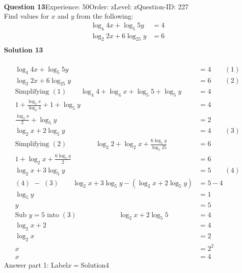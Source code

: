 \documentclass{article}
\begin{document}
\\[4pt]
\noindent\textbf{Question 13}\hspace{20pt}Experience: 50\hspace{20pt}Order: z\hspace{20pt}Level: z\hspace{20pt}Question-ID: 227\\[2pt]
Find values for $x$ and $y$ from the following:
\begin{align*}
\log_{4}4x+\log_{5}5y&=4\\[2pt]
\log_{2}2x+6\log_{25}y&=6\\[-22pt]
\end{align*}
\noindent\textbf{Solution 13}\\[2pt]
\\[-35pt]\begin{align*}
\log_{4}4x+\log_{5}5y&=4\qquad (1)\\[2pt]
\log_{2}2x+6\log_{25}y&=6\qquad (2)\\[2pt]
\text{Simplifying}\,\,(1)\qquad \log_{4}4+\log_{4}x+\log_{5}5+\log_{5}y&=4\\[2pt]
1+\displaystyle\frac{\log_{2}x}{\log_{2}4}+1+\log_{5}y&=4\\[2pt]
\displaystyle\frac{\log_{2}x}{2}+\log_{5}y&=2\\[2pt]
\log_{2}x+2\log_{5}y&=4\qquad (3)\\[2pt]
\text{Simplifying}\,\,(2)\hspace{50pt}\log_{2}2+\log_{2}x+\displaystyle\frac{6\log_{5}y}{\log_{5}25}&=6\\[2pt]
1+\log_{2}x+\displaystyle\frac{6\log_{5}y}{2}&=6\\[2pt]
\log_{2}x+3\log_{5}y&=5\qquad (4)\\[2pt]
(4)\,\,-\,\,(3)\qquad\log_{2}x+3\log_{5}y-(\log_{2}x+2\log_{5}y)&=5-4\\[2pt]
\log_{5}y&=1\\[2pt]
y&=5\\[12pt]
\text{Sub} \,\,y=5\,\,\text{into}\,\,(3)\hspace{73pt} \log_{2}x+2\log_{5}5&=4\\[2pt]
\log_{2}x+2&=4\\[2pt]
\log_{2}x&=2\\[2pt]
x&=2^2\\[2pt]
x&=4
\end{align*}
Answer part 1: \hspace{10pt}Label\hspace{10pt}$x=$\hspace{10pt}Solution\hspace{10pt}4\\
\end{document}

